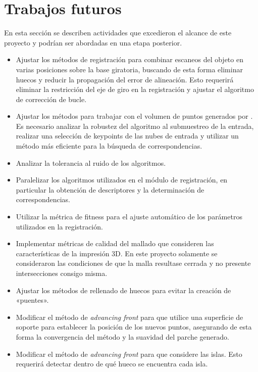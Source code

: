 %


\section{Trabajos futuros}

En esta sección se describen actividades que excedieron el alcance de este proyecto
y podrían ser abordadas en una etapa posterior.

\begin{itemize}
	\item Ajustar los métodos de registración para combinar escaneos del objeto
		en varias posiciones sobre la base giratoria,
		buscando de esta forma eliminar huecos y reducir la propagación del error de alineación.
		Esto requerirá eliminar la restricción del eje de giro en la registración
		y ajustar el algoritmo de corrección de bucle.
	\item Ajustar los métodos para trabajar con el volumen de puntos generados
		por \cite{Pancho}.
		Es necesario analizar la robustez del algoritmo al submuestreo de la entrada,
		realizar una selección de keypoints de las nubes de entrada
		y utilizar un método más eficiente para la búsqueda de correspondencias.
    \item Analizar la tolerancia al ruido de los algoritmos.
	\item Paralelizar los algoritmos utilizados en el módulo de registración,
		en particular la obtención de descriptores y la determinación de correspondencias.
	\item Utilizar la métrica de fitness para el ajuste automático de los parámetros utilizados en la registración.
	\item Implementar métricas de calidad del mallado que consideren las
		características de la impresión 3D.
		En este proyecto solamente se consideraron las condiciones de que la malla
		resultase cerrada y no presente intersecciones consigo misma.
	\item Ajustar los métodos de rellenado de huecos para evitar la creación de «puentes».
	\item Modificar el método de \emph{advancing front} para que utilice una
		superficie de soporte para establecer la posición de los nuevos puntos,
		asegurando de esta forma la convergencia del método y la suavidad del
		parche generado.
	\item Modificar el método de \emph{advancing front} para que considere las islas.
		Esto requerirá detectar dentro de qué hueco se encuentra cada isla.
\end{itemize}
